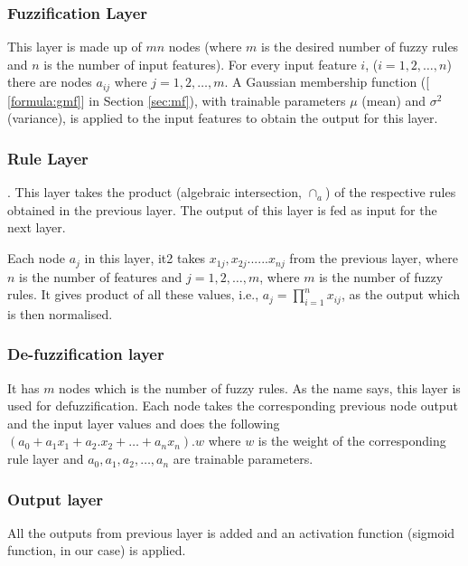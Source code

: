 \documentclass[11pt,a4paper]{article}
\begin{document}

\subsubsection{Fuzzification Layer}
\label{sec:fuzzlayer}
This layer is made up of $mn$ nodes (where $m$ is the desired number of fuzzy rules and $n$ is the number of input features). For every input feature $i$, ($i = 1,2, \dots ,n$) there are nodes $a_{ij}$ where $j = 1,2, \dots ,m$. A Gaussian membership function ([ \ref{formula:gmf}] in Section \ref{sec:mf}), with trainable parameters $\mu$ (mean)  and $\sigma^2$ (variance), is applied to the input features to obtain the output for this layer.

\subsubsection{Rule Layer}.
This layer takes the product (algebraic intersection, $\cap_a$) of the respective rules obtained in the previous layer. The output of this layer is fed as input for the next layer.

Each node {$a_j$} in this layer, it2 takes {$x_{1j},x_{2j}...... x_{nj}$} from the previous layer,
where $n$ is the number of features and $j = 1,2, \dots, m$, where $m$ is the number of fuzzy rules. It gives product of all these values, i.e., $a_j = \prod_{i=1}^n x_{ij}$, as the output which is then normalised.

\subsubsection{De-fuzzification layer}
It has $m$ nodes which is the number of fuzzy rules. As the name says, this layer is used for defuzzification. Each node takes the corresponding previous node output and the input layer values and does the following $(a_0+a_1x_1+a_2.x_2+ \dots + a_nx_n)$.$w$ where $w$ is the weight of the corresponding rule layer and  $a_0,a_1 , a_2 , \dots,  a_{n}$ are trainable parameters.

\subsubsection{Output layer}
All the outputs from previous layer is added and an activation function (sigmoid function, in our case) is applied.
\end{document}

